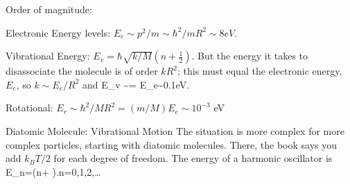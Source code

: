 \documentclass[11pt]{book}
\begin{document}
\item Order of magnitude:
\bee
\item Electronic Energy levels: $E_e\sim p^2/m\sim \hbar^2/mR^2 \sim 8 eV$.
\item Vibrational Energy: $E_v=\hbar \sqrt{k/M}\left( n+ \frac12\right)$. But the energy it takes to disassociate the molecule is of order $kR^2$; this must equal the electronic energy, $E_e$, so $k\sim E_e/R^2$ and
\be
E_v \sim {}= E_e\sim 0.1eV.\ee
\item Rotational: $E_r\sim \hbar^2/MR^2 = (m/M) E_e \sim 10^{-3}$ eV
\eee
\item Diatomic Molecule: Vibrational Motion
The situation is more complex for more complex particles, starting with diatomic molecules. There, the book says you add $k_BT/2$ for each degree of freedom. 
The energy of a harmonic oscillator is
\be
E_n=\hbar \omega\left(n+ \right).\qquad n=0,1,2,\ldots\ee
\end{document}
